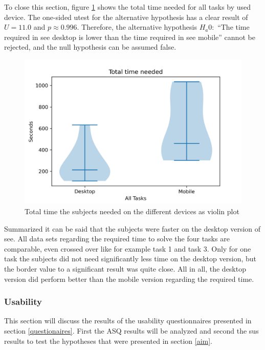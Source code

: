 To close this section, figure \ref{fig:device_time_violin} shows the total time needed for all tasks by used device.
The one-sided \gls{utest} for the alternative hypothesis has a clear result of $U=11.0$ and $p \approx 0.996$.
Therefore, the alternative hypothesis $H_a0:$ \enquote{The time required in {\gls{see}} desktop is lower than the time required in \gls{see} mobile} cannot be rejected, and the null hypothesis can be assumed false.

\begin{figure}[htb]
  \centering
  \includegraphics*[width=1\textwidth]{Evaluation/img/device_time_violin.png}
  \caption{Total time the subjects needed on the different devices as violin plot}
  \label{fig:device_time_violin}
\end{figure}

Summarized it can be said that the subjects were faster on the desktop version of \gls{see}.
All data sets regarding the required time to solve the four tasks are comparable, even crossed over like for example task 1 and task 3. 
Only for one task the subjects did not need significantly less time on the desktop version, but the border value to a significant result was quite close.
All in all, the desktop version did perform better than the mobile version regarding the required time.

\subsubsection{Usability}
\label{sec:usability}
This section will discuss the results of the \gls{usability} questionnaires presented in section \ref{questionaires}.
First the \gls{ASQ} results will be analyzed and second the \gls{sus} results to test the hypotheses that were presented in section \ref{aim}.

